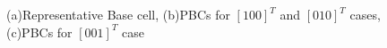 \documentclass[10pt]{article}
\begin{document}
\begin{figure}[H]
\begin{center}
{     }
	\label{fig:pbc}
	\caption{(a)Representative Base cell, (b)PBCs for $[1 0 0]^T$ and $[0 1 0]^T$ cases, (c)PBCs for $[0 0 1]^T$ case}
\end{center}
\end{figure}
\end{document}
